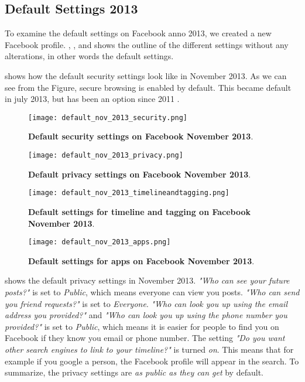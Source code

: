\subsection{Default Settings 2013}
\label{subsec:default2013}

To examine the default settings on Facebook anno 2013, we created a new Facebook profile. , ,  and  shows the outline of the different settings without any alterations, in other words the default settings. 

 shows how the default security settings look like in November 2013. As we can see from the Figure, secure browsing is enabled by default. This became default in july 2013, but has been an option since 2011 \cite{secureBrowsing}. 

\begin{figure}[h!]
\centering
\texttt{[image: default\_nov\_2013\_security.png]}
\caption[Default security settings on Facebook November 2013]{\textbf{Default security settings on Facebook November 2013}.} 
\label{fig:security2013}
\end{figure}

\begin{figure}[h!]
\centering
\texttt{[image: default\_nov\_2013\_privacy.png]}
\caption[Default privacy settings on Facebook November 2013]{\textbf{Default privacy settings on Facebook November 2013}.} 
\label{fig:privacy2013}
\end{figure}

\begin{figure}[h!]
\centering
\texttt{[image: default\_nov\_2013\_timelineandtagging.png]}
\caption[Default settings for timeline and tagging on Facebook November 2013]{\textbf{Default settings for timeline and tagging on Facebook November 2013}.} 
\label{fig:timelineandtagging2013}
\end{figure}

\begin{figure}[h!]
\centering
\texttt{[image: default\_nov\_2013\_apps.png]}
\caption[Default settings for apps on Facebook November 2013]{\textbf{Default  settings for apps on Facebook November 2013}.} 
\label{fig:apps2013}
\end{figure}

 shows the default privacy settings in November 2013.  \textit{"Who can see your future posts?"} is set to \textit{Public}, which means everyone can view you posts. \textit{"Who can send you friend requests?"} is set to \textit{Everyone}. \textit{"Who can look you up using the email address you provided?"} and \textit{"Who can look you up using the phone number you provided?"} is set to \textit{Public}, which means it is easier for people to find you on Facebook if they know you email or phone number. The setting \textit{"Do you want other search engines to link to your timeline?"} is turned \textit{on}. This means that for example if you google a person, the Facebook profile will appear in the search. To summarize, the privacy settings are \textit{as public as they can get} by default. 

